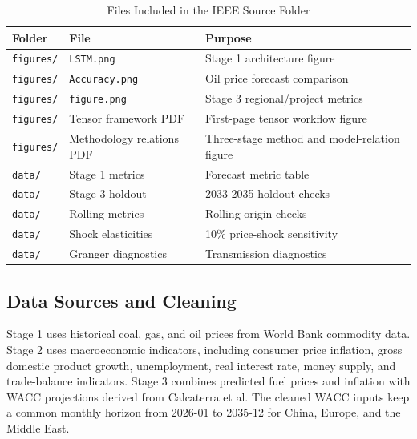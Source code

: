 \begin{table}[!ht]
\centering
\caption{Files Included in the IEEE Source Folder}
\label{tab:appendix-file-inventory}
\scriptsize
\begin{tabular}{P{0.24\columnwidth}P{0.28\columnwidth}P{0.36\columnwidth}}
\toprule
\textbf{Folder} & \textbf{File} & \textbf{Purpose} \\
\midrule
\texttt{figures/} & \texttt{LSTM.png} & Stage 1 architecture figure \\
\texttt{figures/} & \texttt{Accuracy.png} & Oil price forecast comparison \\
\texttt{figures/} & \texttt{figure.png} & Stage 3 regional/project metrics \\
\texttt{figures/} & Tensor framework PDF & First-page tensor workflow figure \\
\texttt{figures/} & Methodology relations PDF & Three-stage method and model-relation figure \\
\texttt{data/} & Stage 1 metrics & Forecast metric table \\
\texttt{data/} & Stage 3 holdout & 2033-2035 holdout checks \\
\texttt{data/} & Rolling metrics & Rolling-origin checks \\
\texttt{data/} & Shock elasticities & 10\% price-shock sensitivity \\
\texttt{data/} & Granger diagnostics & Transmission diagnostics \\
\bottomrule
\end{tabular}
\end{table}

\subsection{Data Sources and Cleaning}

Stage 1 uses historical coal, gas, and oil prices from World Bank commodity data. Stage 2 uses macroeconomic indicators, including consumer price inflation, gross domestic product growth, unemployment, real interest rate, money supply, and trade-balance indicators. Stage 3 combines predicted fuel prices and inflation with WACC projections derived from Calcaterra et al. The cleaned WACC inputs keep a common monthly horizon from 2026-01 to 2035-12 for China, Europe, and the Middle East.


